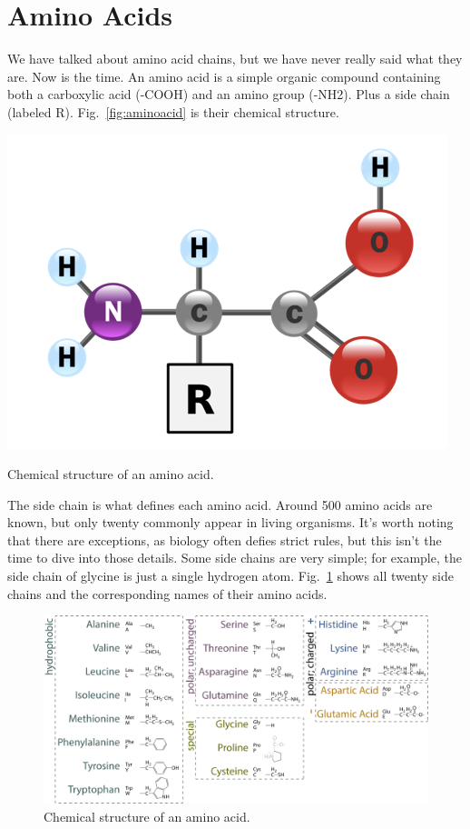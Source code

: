 \section{Amino Acids}

We have talked about amino acid chains, but we have never really said what they are. Now is the time. An amino acid is a simple organic compound containing both a carboxylic acid (-COOH) and an amino group (-NH2). Plus a side chain (labeled R). Fig.~\ref{fig:aminoacid} is their chemical structure.

\begin{marginfigure}
    \includegraphics{figs/molbiol/aminoacid.png}
    \caption[6pt]{Chemical structure of an amino acid.}
    \label{fig:aminoacid}
\end{marginfigure}

The side chain is what defines each amino acid. Around 500 amino acids are known, but only twenty commonly appear in living organisms. It's worth noting that there are exceptions, as biology often defies strict rules, but this isn't the time to dive into those details. Some side chains are very simple; for example, the side chain of glycine is just a single hydrogen atom. Fig.~\ref{fig:aminoacids} shows all twenty side chains and the corresponding names of their amino acids.

\begin{figure}
    \includegraphics{figs/molbiol/aminoacids.png}
    \caption[6pt]{Chemical structure of an amino acid.}
    \label{fig:aminoacids}
\end{figure}

